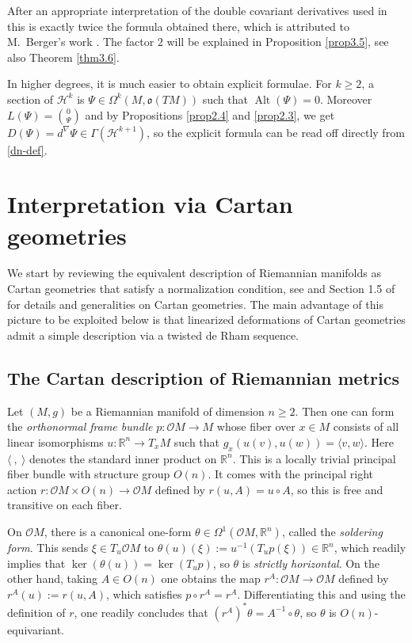 \documentclass[12pt,a4paper]{amsart}
\def\frak{\mathfrak}
\def\Bbb{\mathbb}
\def\Cal{\mathcal}
\newcommand{\x}{\times}
\renewcommand{\o}{\circ}
\renewcommand{\th}{\theta}
\newcommand{\Ga}{\Gamma}
\newcommand{\Om}{\Omega}
\newcommand{\Alt}{\operatorname{Alt}}
\numberwithin{theorem}{section}
\numberwithin{equation}{section}
\theoremstyle{definition}
\theoremstyle{remark}
\begin{document}
After an appropriate interpretation of the double covariant derivatives used in
\cite{BBL} this is exactly twice the formula obtained there, which is attributed to
M.\ Berger's work \cite{Berger}. The factor $2$ will be explained in Proposition
\ref{prop3.5}, see also Theorem \ref{thm3.6}. 

\medskip

In higher degrees, it is much easier to obtain explicit formulae. For
$k\geq 2$, a section of $\Cal H^k$ is $\Psi\in\Om^k(M,\frak o(TM))$
such that $\Alt(\Psi)=0$. Moreover $L(\Psi)=\binom{0}{\Psi}$ and by Propositions
\ref{prop2.4} and \ref{prop2.3}, we get $D(\Psi)=d^{\nabla}\Psi\in\Ga(\Cal H^{k+1})$,
so the explicit formula can be read off directly from \eqref{dn-def}.  


\section{Interpretation via Cartan geometries}\label{3}
We start by reviewing the equivalent description of Riemannian manifolds as Cartan
geometries that satisfy a normalization condition, see \cite{Sharpe} and Section 1.5
of \cite{book} for details and generalities on Cartan geometries. The main advantage
of this picture to be exploited below is that linearized deformations of Cartan
geometries admit a simple description via a twisted de Rham sequence.

\subsection{The Cartan description of Riemannian metrics}\label{3.1}
Let $(M,g)$ be a Riemannian manifold of dimension $n\geq 2$. Then one can form the
\textit{orthonormal frame bundle} $p:\Cal OM\to M$ whose fiber over $x\in M$ consists
of all linear isomorphisms $u:\Bbb R^n\to T_xM$ such that $g_x(u(v),u(w))=\langle
v,w\rangle$. Here $\langle\ ,\ \rangle$ denotes the standard inner product on $\Bbb
R^n$. This is a locally trivial principal fiber bundle with structure group
$O(n)$. It comes with the principal right action $r:\Cal OM\x O(n)\to\Cal OM$
defined by $r(u,A)=u\o A$, so this is free and transitive on each fiber.

On $\Cal OM$, there is a canonical one-form $\th\in\Om^1(\Cal OM,\Bbb R^n)$, called
the \textit{soldering form}. This sends $\xi\in T_u\Cal OM$ to
$\th(u)(\xi):=u^{-1}(T_up(\xi))\in\Bbb R^n$, which readily implies that
$\ker(\th(u))=\ker(T_up)$, so $\th$ is \textit{strictly horizontal}. On the other
hand, taking $A\in O(n)$ one obtains the map $r^A:\Cal OM\to\Cal OM$ defined by
$r^A(u):=r(u,A)$, which satisfies $p\o r^A=r^A$. Differentiating this and using the
definition of $r$, one readily concludes that $(r^A)^*\th=A^{-1}\o\th$, so $\th$ is
$O(n)$-equivariant.
\end{document}
